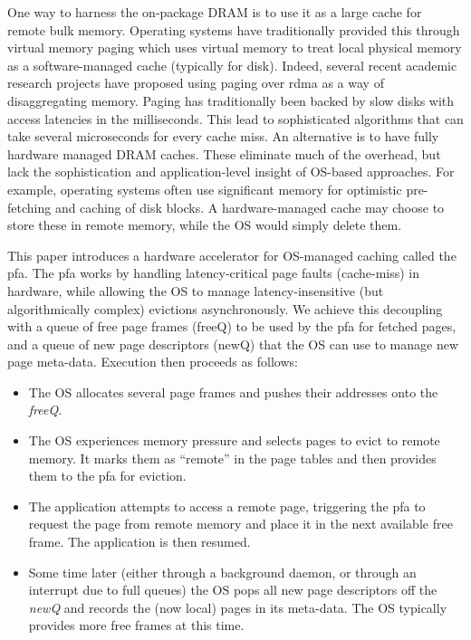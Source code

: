 One way to harness the on-package DRAM is to use it as a large cache for remote
bulk memory. Operating systems have traditionally provided this through virtual
memory \gls{paging} which uses virtual memory to treat local physical memory as
a software-managed cache (typically for disk). Indeed, several recent academic
research projects have proposed using paging over \gls{rdma} as a way of
disaggregating memory\cite{infiniswap}\cite{osdidisag}. Paging has
traditionally been backed by slow disks with access latencies in the
milliseconds. This lead to sophisticated algorithms that can take several
microseconds for every cache miss. An alternative is to have fully hardware
managed DRAM caches\cite{volos_DRAM}\cite{lee_tagless}. These eliminate much of
the overhead, but lack the sophistication and application-level insight of
OS-based approaches. For example, operating systems often use significant
memory for optimistic pre-fetching and caching of disk blocks. A
hardware-managed cache may choose to store these in remote memory, while the OS
would simply delete them.

This paper introduces a hardware accelerator for OS-managed caching called the
\gls{pfa}. The \gls{pfa} works by handling latency-critical page faults
(cache-miss) in hardware, while allowing the OS to manage latency-insensitive
(but algorithmically complex) evictions asynchronously. We achieve this
decoupling with a queue of free page frames (freeQ) to be used by the \gls{pfa}
for fetched pages, and a queue of new page descriptors (newQ) that the OS can
use to manage new page meta-data. Execution then proceeds as follows:

\begin{itemize}
	 \item The OS allocates several page frames and pushes their addresses onto
		 the \emph{freeQ}.
   \item The OS experiences memory pressure and selects pages to evict to
		 remote memory. It marks them as ``remote'' in the page tables and then
     provides them to the \gls{pfa} for eviction.
   \item The application attempts to access a remote page, triggering the
     \gls{pfa} to request the page from remote memory and place it in the next
     available free frame. The application is then resumed.
	 \item Some time later (either through a background daemon, or through an
		 interrupt due to full queues) the OS pops all new page descriptors off
		 the \emph{newQ} and records the (now local) pages in its meta-data. The
		 OS typically provides more free frames at this time.
\end{itemize}


